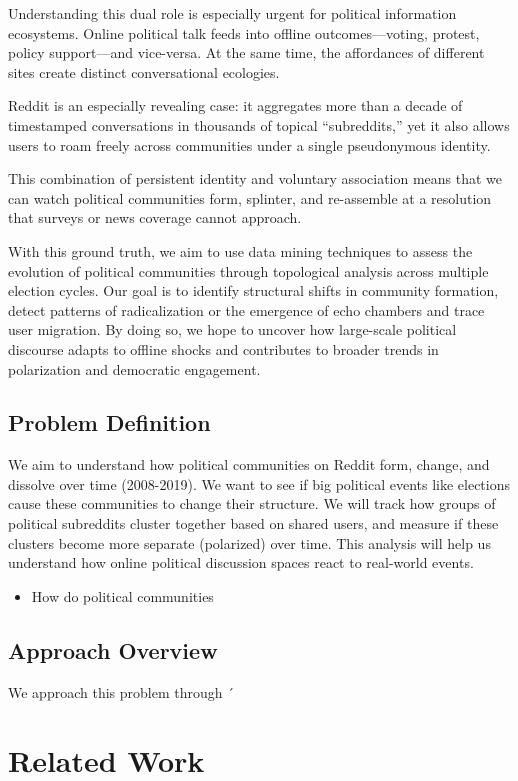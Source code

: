 \documentclass{article}
\begin{document}
Understanding this dual role is especially urgent for political information ecosystems. Online political talk feeds into offline outcomes—voting, protest, policy support—and vice-versa. At the same time, the affordances of different sites create distinct conversational ecologies.

Reddit is an especially revealing case: it aggregates more than a decade of timestamped conversations in thousands of topical “subreddits,” yet it also allows users to roam freely across communities under a single pseudonymous identity.

This combination of persistent identity and voluntary association means that we can watch political communities form, splinter, and re-assemble at a resolution that surveys or news coverage cannot approach.

With this ground truth, we aim to use data mining techniques to assess the evolution of political communities through topological analysis across multiple election cycles. Our goal is to identify structural shifts in community formation, detect patterns of radicalization or the emergence of echo chambers and trace user migration. By doing so, we hope to uncover how large-scale political discourse adapts to offline shocks and contributes to broader trends in polarization and democratic engagement.


\subsection{Problem Definition}
We aim to understand how political communities on Reddit form, change, and dissolve over time (2008-2019). We want to see if big political events like elections cause these communities to change their structure. We will track how groups of political subreddits cluster together based on shared users, and measure if these clusters become more separate (polarized) over time. This analysis will help us understand how online political discussion spaces react to real-world events.
\begin{itemize}
    \item How do political communities 
\end{itemize}

\subsection{Approach Overview}
We approach this problem through ´

\section{Related Work}
\end{document}
